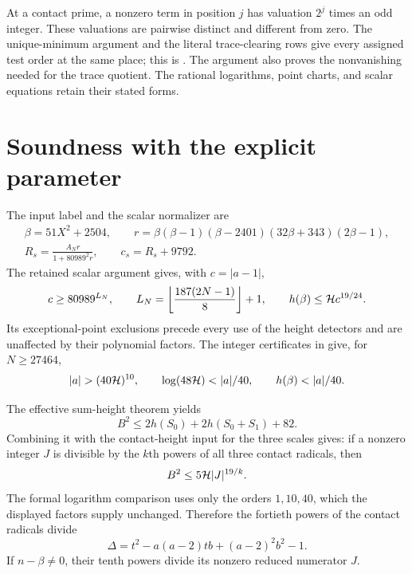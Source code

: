 \documentclass[11pt,a4paper]{article}
\theoremstyle{remark}\newtheorem{remark}[theorem]{Remark}
\begin{document}
At a contact prime, a nonzero term in position $j$ has valuation
$2^j$ times an odd integer. These valuations are pairwise distinct
and different from zero. The unique-minimum argument and the literal
trace-clearing rows give every assigned test order at the same place;
this is \cite[Proposition~1.2]{Packing}. The argument also proves the
nonvanishing needed for the trace quotient. The rational logarithms,
point charts, and scalar equations retain their stated forms.

\section{Soundness with the explicit parameter}
The input label and the scalar normalizer are
\[
 \begin{gathered}
 \beta=51X^2+2504,\qquad
 r=\beta(\beta-1)(\beta-2401)(32\beta+343)(2\beta-1),\\
 R_s=\frac{A_Nr}{1+80989^2r},\qquad c_s=R_s+9792.
 \end{gathered}
\]
The retained scalar argument gives, with $c=|a-1|$,
\[
 c\ge80989^{L_N},\qquad
 L_N=\left\lfloor\frac{187(2N-1)}8\right\rfloor+1,\qquad
 h(\beta)\le\mathcal H c^{19/24}.
\]
Its exceptional-point exclusions precede every use of the height
detectors and are unaffected by their polynomial factors. The integer
certificates in \cite{Baseline} give, for $N\ge27464$,
\begin{equation}\label{eq:margins}
 |a|>(40\HH)^{10},\qquad
 \log(48\HH)<|a|/40,\qquad h(\beta)<|a|/40.
\end{equation}

The effective sum-height theorem yields
\[
 B^2\le2h(S_0)+2h(S_0+S_1)+82.
\]
Combining it with the contact-height input for the three scales gives:
if a nonzero integer $J$ is divisible by the $k$th powers of all three
contact radicals, then
\begin{equation}\label{eq:height}
                          B^2\le5\mathcal H |J|^{19/k}.
\end{equation}
The formal logarithm comparison uses only the orders $1,10,40$,
which the displayed factors supply unchanged. Therefore the fortieth
powers of the contact radicals divide
\[
 \Delta=t^2-a(a-2)tb+(a-2)^2b^2-1.
\]
If $n-\beta\ne0$, their tenth powers divide its nonzero reduced
numerator $J$.
\end{document}
